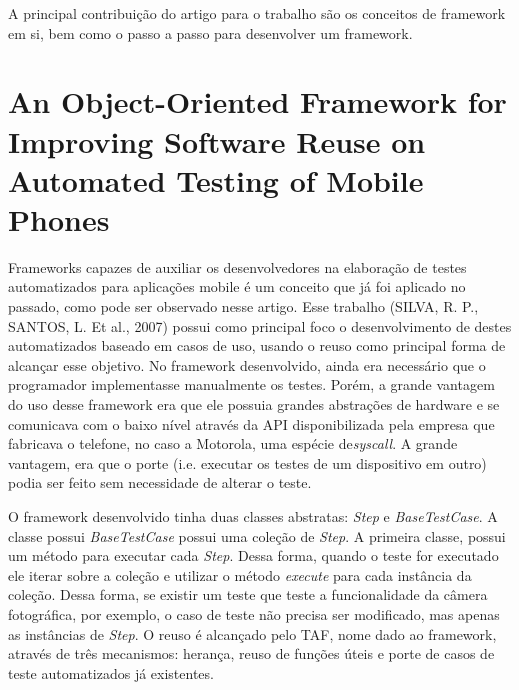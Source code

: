 \documentclass[
    12pt,       %
    openright,      %
    twoside,      %
    a4paper,      %
    english,      %
    french,       %
    spanish,      %
    brazil,       %
    ]{abntex2}
\begin{document}
    A principal contribuição do artigo para o trabalho são os conceitos de framework em si, bem como
    o passo a passo para desenvolver um framework.

    \section{An Object-Oriented Framework for Improving Software Reuse on Automated Testing of Mobile Phones}
      Frameworks capazes de auxiliar os desenvolvedores na elaboração de testes automatizados para aplicações
      mobile é um conceito que já foi aplicado no passado, como pode ser observado nesse artigo. Esse
      trabalho (SILVA, R. P., SANTOS, L. Et al., 2007) possui como principal foco o desenvolvimento de destes
      automatizados baseado em casos de uso, usando o reuso como principal forma de alcançar esse objetivo.
      No framework desenvolvido, ainda era necessário que o programador implementasse manualmente os testes.
      Porém, a grande vantagem do uso desse framework era que ele possuia grandes abstrações de hardware
      e se comunicava com o baixo nível através da API disponibilizada pela empresa que fabricava o
      telefone, no caso a Motorola, uma espécie de\textit{syscall}. A grande vantagem, era que o porte
      (i.e. executar os testes de um dispositivo em outro) podia ser feito sem necessidade de alterar o teste.

      O framework desenvolvido tinha duas classes abstratas: \textit{Step} e \textit{BaseTestCase}. A
      classe possui \textit{BaseTestCase} possui uma coleção de \textit{Step}. A primeira classe,
      possui um método para executar cada \textit{Step}. Dessa forma, quando o teste for executado
      ele iterar sobre a coleção e utilizar o método \textit{execute} para cada instância da coleção.
      Dessa forma, se existir um teste que teste a funcionalidade da câmera fotográfica, por exemplo, o
      caso de teste não precisa ser modificado, mas apenas as instâncias de \textit{Step}. O reuso é
      alcançado pelo TAF, nome dado ao framework, através de três mecanismos: herança, reuso de funções
      úteis e porte de casos de teste automatizados já existentes.
\end{document}
